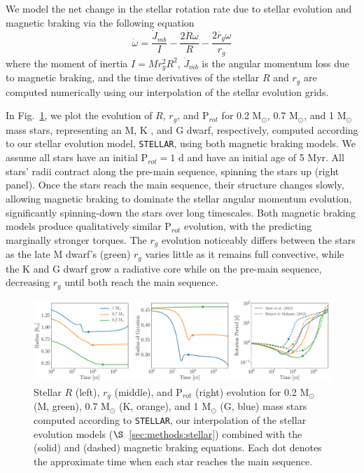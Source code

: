 \documentclass[twocolumn]{aastex61}
\newcommand{\stellar}[0]{\texttt{STELLAR}\xspace}
\begin{document}
We model the net change in the stellar rotation rate due to stellar evolution and magnetic braking via the following equation 
\begin{equation} \label{eqn:stellar_rot_rate_dt}
\dot{\omega} = \frac{\dot{J}_{mb}}{I} - \frac{2 \dot{R} \omega}{R} - \frac{2 \dot{r_g} \omega}{r_g}
\end{equation}
where the moment of inertia $I = M r_g^2 R^2$, $\dot{J}_{mb}$ is the angular momentum loss due to magnetic braking, and the time derivatives of the stellar $R$ and $r_g$ are computed numerically using our interpolation of the \citet{Baraffe2015} stellar evolution grids.  

In Fig.~\ref{fig:stellarExample}, we plot the evolution of $R$, $r_g$, and P$_{rot}$ for 0.2 M$_{\odot}$, 0.7 M$_{\odot}$, and 1 M$_{\odot}$ mass stars, representing an M, K , and G dwarf, respectively, computed according to our stellar evolution model, \stellar, using both magnetic braking models. We assume all stars have an initial P$_{rot} = 1$ d and have an initial age of 5 Myr. All stars' radii contract along the pre-main sequence, spinning the stars up (right panel). Once the stars reach the main sequence, their structure changes slowly, allowing magnetic braking to dominate the stellar angular momentum evolution, significantly spinning-down the stars over long timescales. Both magnetic braking models produce qualitatively similar P$_{rot}$ evolution, with the \citet{Reiners2012} predicting marginally stronger torques. The $r_g$ evolution noticeably differs between the stars as the late M dwarf's (green) $r_g$ varies little as it remains full convective, while the K and G dwarf grow a radiative core while on the pre-main sequence, decreasing $r_g$ until both reach the main sequence.

\begin{figure}[ht]
	\includegraphics[width=\textwidth]{../Plots/stellarExample.pdf}
   \caption{Stellar $R$ (left), $r_g$ (middle), and P$_{rot}$ (right) evolution for 0.2 M$_{\odot}$ (M, green), 0.7 M$_{\odot}$ (K, orange), and 1 M$_{\odot}$ (G, blue) mass stars computed according to \stellar, our interpolation of the \citet{Baraffe2015} stellar evolution models ($\S$~\ref{sec:methods:stellar}) combined with the \citet{Matt2015} (solid) and \citet{Reiners2012} (dashed) magnetic braking equations. Each dot denotes the approximate time when each star reaches the main sequence.}%
    \label{fig:stellarExample}%
\end{figure}
\end{document}
